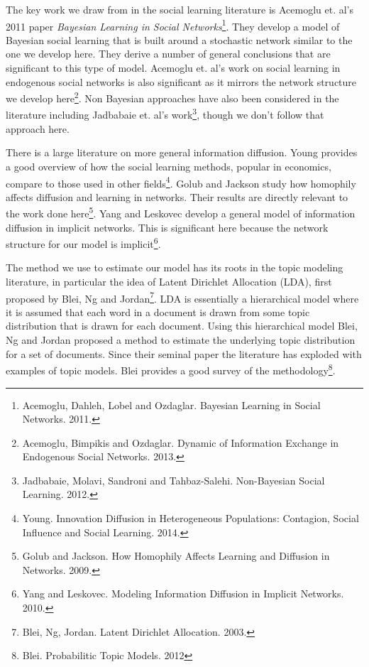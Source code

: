 \documentclass[a4paper]{article}
\begin{document}
The key work we draw from in the social learning literature is Acemoglu et. al's 2011 paper \emph{Bayesian Learning in Social Networks}\footnote{Acemoglu, Dahleh, Lobel and Ozdaglar.  Bayesian Learning in Social Networks. 2011.}.  They develop a model of Bayesian social learning that is built around a stochastic network similar to the one we develop here.  They derive a number of general conclusions that are significant to this type of model. Acemoglu et. al's work on social learning in endogenous social networks is also significant as it mirrors the network structure we develop here\footnote{Acemoglu, Bimpikis and Ozdaglar.  Dynamic of Information Exchange in Endogenous Social Networks.  2013.}.  Non Bayesian approaches have also been considered in the literature including Jadbabaie et. al's work\footnote{Jadbabaie, Molavi, Sandroni and Tahbaz-Salehi.  Non-Bayesian Social Learning.  2012.}, though we don't follow that approach here.

There is a large literature on more general information diffusion.  Young provides a good overview of how the social learning methods, popular in economics, compare to those used in other fields\footnote{Young.  Innovation Diffusion in Heterogeneous Populations: Contagion, Social Influence and Social Learning.  2014.}.  Golub and Jackson study how homophily affects diffusion and learning in networks.  Their results are directly relevant to the work done here\footnote{Golub and Jackson.  How Homophily Affects Learning and Diffusion in Networks. 2009.}.
 Yang and Leskovec develop a general model of information diffusion in implicit networks.  This is significant here because the network structure for our model is implicit\footnote{Yang and Leskovec.  Modeling Information Diffusion in Implicit Networks.  2010.}.

The method we use to estimate our model has its roots in the topic modeling literature, in particular the idea of Latent Dirichlet Allocation (LDA), first proposed by Blei, Ng and Jordan\footnote{Blei, Ng, Jordan. Latent Dirichlet Allocation. 2003.}.  LDA is essentially a hierarchical model where it is assumed that each word in a document is drawn from some topic distribution that is drawn for each document.  Using this hierarchical model Blei, Ng and Jordan proposed a method to estimate the underlying topic distribution for a set of documents.  Since their seminal paper the literature has exploded with examples of topic models.  Blei provides a good survey of the methodology\footnote{Blei.  Probabilitic Topic Models. 2012}.
\end{document}
